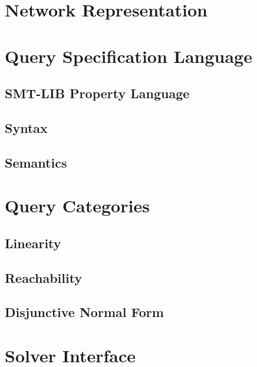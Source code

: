 \documentclass[12pt,a4paper]{report}
\begin{document}
\chapter{Network Representation}\label{sec:model}


\chapter{Query Specification Language}\label{sec:specification_language}

\section{SMT-LIB Property Language}\label{sec:smtlib}


\section{Syntax}\label{sec:syntax}


\section{Semantics}\label{sec:semantics}


\chapter{Query Categories}\label{sec:query_categories}

\section{Linearity}\label{sec:linearity}

\section{Reachability}\label{sec:reachability}

\section{Disjunctive Normal Form}\label{sec:dnf}


\chapter{Solver Interface}\label{sec:solver_interface}
\end{document}
